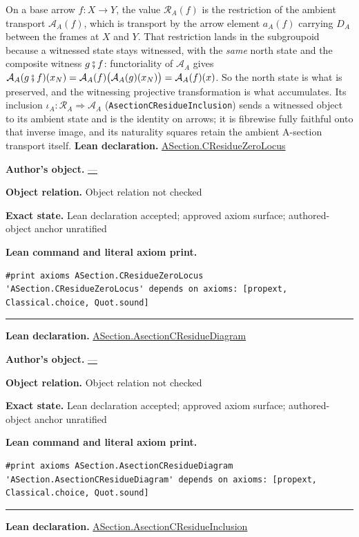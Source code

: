 \documentclass[11pt]{article}
\theoremstyle{plain}
\theoremstyle{definition}
\theoremstyle{remark}
\begin{document}
\begin{tcolorbox}[provenancecard,title={45. Definition - The residue subdiagram and its inclusion},title after break={45. Definition - The residue subdiagram and its inclusion (continued)}]
On a base arrow $f:X\to Y$, the value $\mathcal R_A(f)$ is the restriction of
the ambient transport $\mathcal A_A(f)$, which is transport by the arrow
element $a_A(f)$ carrying $D_A$ between the frames at $X$ and $Y$. That
restriction lands in the subgroupoid because a witnessed state stays witnessed,
with the \emph{same} north state and the composite witness $g\fatsemi f$:
functoriality of $\mathcal A_A$ gives
$\mathcal A_A(g\fatsemi f)(x_N)=\mathcal A_A(f)\bigl(\mathcal A_A(g)(x_N)\bigr)
 =\mathcal A_A(f)(x)$.
So the north state is what is preserved, and the witnessing projective
transformation is what accumulates.
Its inclusion $\iota_A:\mathcal R_A\Rightarrow\mathcal A_A$
\textup{(}\texttt{AsectionCResidueInclusion}\textup{)} sends a witnessed object
to its ambient state and is the identity on arrows; it is fibrewise fully
faithful onto that inverse image, and its naturality squares retain the ambient
A-section transport itself.
\tcblower
\textbf{Lean declaration.} \url{ASection.CResidueZeroLocus}
\par\textbf{Author's object.} \url{—}
\par\textbf{Object relation.} Object relation not checked
\par\textbf{Exact state.} Lean declaration accepted; approved axiom surface; authored-object anchor unratified
\par\smallskip\textbf{Lean command and literal axiom print.}
\begin{Verbatim}[breaklines=true,breakanywhere=true,fontsize=\small]
#print axioms ASection.CResidueZeroLocus
'ASection.CResidueZeroLocus' depends on axioms: [propext, Classical.choice, Quot.sound]
\end{Verbatim}
\medskip\hrule\medskip
\textbf{Lean declaration.} \url{ASection.AsectionCResidueDiagram}
\par\textbf{Author's object.} \url{—}
\par\textbf{Object relation.} Object relation not checked
\par\textbf{Exact state.} Lean declaration accepted; approved axiom surface; authored-object anchor unratified
\par\smallskip\textbf{Lean command and literal axiom print.}
\begin{Verbatim}[breaklines=true,breakanywhere=true,fontsize=\small]
#print axioms ASection.AsectionCResidueDiagram
'ASection.AsectionCResidueDiagram' depends on axioms: [propext, Classical.choice, Quot.sound]
\end{Verbatim}
\medskip\hrule\medskip
\textbf{Lean declaration.} \url{ASection.AsectionCResidueInclusion}

\end{tcolorbox}
\end{document}
